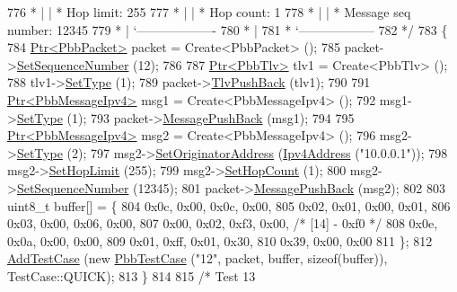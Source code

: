 \begin{DoxyCode}
776 \textcolor{comment}{         * |    | * Hop limit:          255}
777 \textcolor{comment}{         * |    | * Hop count:          1}
778 \textcolor{comment}{         * |    | * Message seq number: 12345}
779 \textcolor{comment}{         * |    `-------------------}
780 \textcolor{comment}{         * |}
781 \textcolor{comment}{         * `------------------}
782 \textcolor{comment}{   */}
783   \{
784     \hyperlink{classns3_1_1Ptr}{Ptr<PbbPacket>} packet = Create<PbbPacket> ();
785     packet->\hyperlink{classns3_1_1PbbPacket_a7d6a1602be86109760d0f26ff9bbbb8e}{SetSequenceNumber} (12);
786 
787     \hyperlink{classns3_1_1Ptr}{Ptr<PbbTlv>} tlv1 = Create<PbbTlv> ();
788     tlv1->\hyperlink{classns3_1_1PbbTlv_a90a0452018ed364ac37c3ad116dd718b}{SetType} (1);
789     packet->\hyperlink{classns3_1_1PbbPacket_a34935793e729a106c176db99c969cb42}{TlvPushBack} (tlv1);
790 
791     \hyperlink{classns3_1_1Ptr}{Ptr<PbbMessageIpv4>} msg1 = Create<PbbMessageIpv4> ();
792     msg1->\hyperlink{classns3_1_1PbbMessage_a4b3d1eaabd3e7412a46ac79bf3360dac}{SetType} (1);
793     packet->\hyperlink{classns3_1_1PbbPacket_a4a3170001ef758d9c9c4375b8f089826}{MessagePushBack} (msg1);
794 
795     \hyperlink{classns3_1_1Ptr}{Ptr<PbbMessageIpv4>} msg2 = Create<PbbMessageIpv4> ();
796     msg2->\hyperlink{classns3_1_1PbbMessage_a4b3d1eaabd3e7412a46ac79bf3360dac}{SetType} (2);
797     msg2->\hyperlink{classns3_1_1PbbMessage_a52ac135a2bec53db5e8f46b8b8a25e7c}{SetOriginatorAddress} (\hyperlink{classns3_1_1Ipv4Address}{Ipv4Address} (\textcolor{stringliteral}{"10.0.0.1"}));
798     msg2->\hyperlink{classns3_1_1PbbMessage_a532a7e5e135f7491f8a84ab1dfadd28f}{SetHopLimit} (255);
799     msg2->\hyperlink{classns3_1_1PbbMessage_a882ec7e2e9a9dff6297152c196d54ce4}{SetHopCount} (1);
800     msg2->\hyperlink{classns3_1_1PbbMessage_a8c24696ac67507afa03c9750daccc47d}{SetSequenceNumber} (12345);
801     packet->\hyperlink{classns3_1_1PbbPacket_a4a3170001ef758d9c9c4375b8f089826}{MessagePushBack} (msg2);
802 
803     uint8\_t buffer[] = \{
804       0x0c, 0x00, 0x0c, 0x00,
805       0x02, 0x01, 0x00, 0x01,
806       0x03, 0x00, 0x06, 0x00,
807       0x00, 0x02, 0xf3, 0x00,   \textcolor{comment}{/* [14] - 0xf0 */}
808       0x0e, 0x0a, 0x00, 0x00,
809       0x01, 0xff, 0x01, 0x30,
810       0x39, 0x00, 0x00
811     \};
812     \hyperlink{classns3_1_1TestCase_a3718088e3eefd5d6454569d2e0ddd835}{AddTestCase} (\textcolor{keyword}{new} \hyperlink{classPbbTestCase}{PbbTestCase} (\textcolor{stringliteral}{"12"}, packet, buffer, \textcolor{keyword}{sizeof}(buffer)), 
      TestCase::QUICK);
813   \}
814 
815   \textcolor{comment}{/* Test 13}

\end{DoxyCode}
